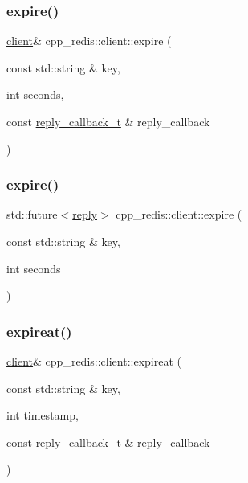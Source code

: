 \subsubsection{\texorpdfstring{expire()}{expire()}\hspace{0.1cm}{\footnotesize\ttfamily [1/2]}}
{\footnotesize\ttfamily \hyperlink{classcpp__redis_1_1client}{client}\& cpp\+\_\+redis\+::client\+::expire (\begin{DoxyParamCaption}\item[{const std\+::string \&}]{key,  }\item[{int}]{seconds,  }\item[{const \hyperlink{classcpp__redis_1_1client_a061a1140d36d2eaeda82b09a0bb3f9f2}{reply\+\_\+callback\+\_\+t} \&}]{reply\+\_\+callback }\end{DoxyParamCaption})}

\mbox{\label{classcpp__redis_1_1client_aeb2f8b475d5adf23a25ae066e1ff45f4}} 
\subsubsection{\texorpdfstring{expire()}{expire()}\hspace{0.1cm}{\footnotesize\ttfamily [2/2]}}
{\footnotesize\ttfamily std\+::future$<$\hyperlink{classcpp__redis_1_1reply}{reply}$>$ cpp\+\_\+redis\+::client\+::expire (\begin{DoxyParamCaption}\item[{const std\+::string \&}]{key,  }\item[{int}]{seconds }\end{DoxyParamCaption})}

\mbox{\label{classcpp__redis_1_1client_a7b5e1b089d68a0cb71f72fb6aecb0a63}} 
\subsubsection{\texorpdfstring{expireat()}{expireat()}\hspace{0.1cm}{\footnotesize\ttfamily [1/2]}}
{\footnotesize\ttfamily \hyperlink{classcpp__redis_1_1client}{client}\& cpp\+\_\+redis\+::client\+::expireat (\begin{DoxyParamCaption}\item[{const std\+::string \&}]{key,  }\item[{int}]{timestamp,  }\item[{const \hyperlink{classcpp__redis_1_1client_a061a1140d36d2eaeda82b09a0bb3f9f2}{reply\+\_\+callback\+\_\+t} \&}]{reply\+\_\+callback }\end{DoxyParamCaption})}


